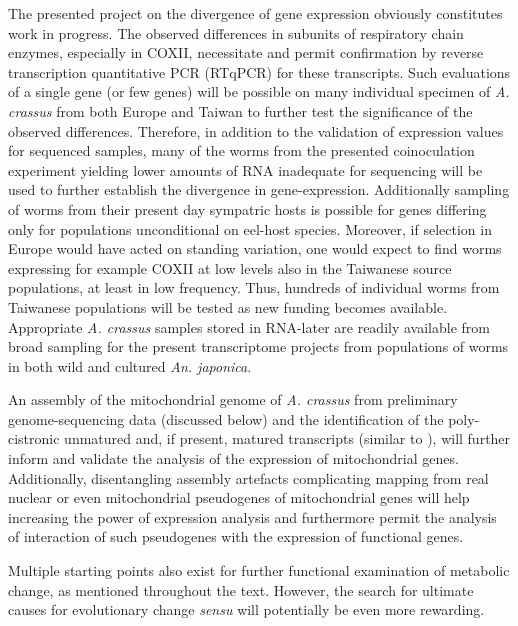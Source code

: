 The presented project on the divergence of gene expression obviously
constitutes work in progress. The observed differences in subunits of
respiratory chain enzymes, especially in COXII, necessitate and permit
confirmation by reverse transcription quantitative PCR (RTqPCR) for
these transcripts. Such evaluations of a single gene (or few genes)
will be possible on many individual specimen of \textit{A. crassus}
from both Europe and Taiwan to further test the significance of the
observed differences. Therefore, in addition to the validation of
expression values for sequenced samples, many of the worms from the
presented coinoculation experiment yielding lower amounts of RNA
inadequate for sequencing will be used to further establish the
divergence in gene-expression. Additionally sampling of worms from
their present day sympatric hosts is possible for genes differing only
for populations unconditional on eel-host species. Moreover, if
selection in Europe would have acted on standing variation, one would
expect to find worms expressing for example COXII at low levels also
in the Taiwanese source populations, at least in low frequency. Thus,
hundreds of individual worms from Taiwanese populations will be tested
as new funding becomes available. Appropriate \textit{A. crassus}
samples stored in RNA-later are readily available from broad sampling
for the present transcriptome projects from populations of worms in
both wild and cultured \textit{An. japonica}.

An assembly of the mitochondrial genome of \textit{A. crassus} from
preliminary genome-sequencing data (discussed below) and the
identification of the poly-cistronic unmatured and, if present,
matured transcripts (similar to \cite{pmid19843606}), will further
inform and validate the analysis of the expression of mitochondrial
genes. Additionally, disentangling assembly artefacts complicating
mapping from real nuclear or even mitochondrial \cite{pmid20026478}
pseudogenes of mitochondrial genes will help increasing the power of
expression analysis and furthermore permit the analysis of interaction
of such pseudogenes with the expression of functional genes.

Multiple starting points also exist for further functional examination
of metabolic change, as mentioned throughout the text. However, the
search for ultimate causes for evolutionary change \textit{sensu}
\cite{mayr1961cause} will potentially be even more rewarding.

